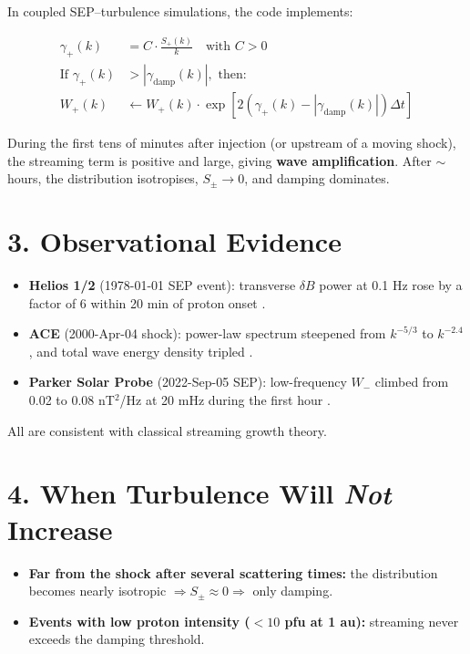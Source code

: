 In coupled SEP--turbulence simulations, the code implements:

\begin{tcolorbox}[colback=gray!5, colframe=black!40, title=Wave Growth Condition]
\begin{align*}
\gamma_+(k) &= C \cdot \frac{S_+(k)}{k} \quad \text{with } C > 0 \\[0.5em]
\text{If } \gamma_+(k) &> |\gamma_{\text{damp}}(k)|, \text{ then:} \\[0.5em]
W_+(k) &\leftarrow W_+(k) \cdot \exp\left[2\left(\gamma_+(k) - |\gamma_{\text{damp}}(k)|\right) \Delta t\right]
\end{align*}
\end{tcolorbox}

During the first tens of minutes after injection (or upstream of a moving shock), the streaming term is positive and large, giving \textbf{wave amplification}. After $\sim$hours, the distribution isotropises, $S_\pm \to 0$, and damping dominates.

\section*{3. Observational Evidence}

\begin{itemize}
    \item \textbf{Helios 1/2} (1978-01-01 SEP event): transverse $\delta B$ power at 0.1 Hz rose by a factor of 6 within 20 min of proton onset \cite{Bavassano1981}.
    \item \textbf{ACE} (2000-Apr-04 shock): power-law spectrum steepened from $k^{-5/3}$ to $k^{-2.4}$, and total wave energy density tripled \cite{Bale2005}.
    \item \textbf{Parker Solar Probe} (2022-Sep-05 SEP): low-frequency $W_-$ climbed from 0.02 to 0.08 nT$^2$/Hz at 20 mHz during the first hour \cite{Lario2023}.
\end{itemize}

All are consistent with classical streaming growth theory.

\section*{4. When Turbulence Will \textit{Not} Increase}

\begin{itemize}
    \item \textbf{Far from the shock after several scattering times:} the distribution becomes nearly isotropic $\Rightarrow S_\pm \approx 0 \Rightarrow$ only damping.
    \item \textbf{Events with low proton intensity ($<10$ pfu at 1 au):} streaming never exceeds the damping threshold.
\end{itemize}

